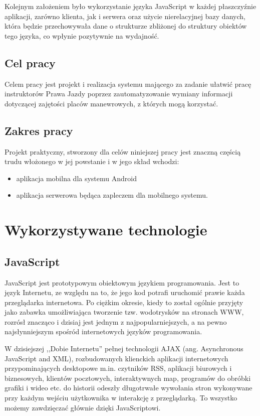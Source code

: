 \documentclass[twoside,a4paper,openright,12pt]{book}
\begin{document}
Kolejnym założeniem było wykorzystanie języka JavaScript w każdej płaszczyźnie aplikacji, zarówno klienta, jak i serwera oraz użycie nierelacyjnej bazy danych, która będzie przechowywała dane o strukturze zbliżonej do struktury obiektów tego języka, co wpłynie pozytywnie na wydajność.


\section{Cel pracy}

Celem pracy jest projekt i realizacja systemu mającego za zadanie ułatwić pracę instruktorów Prawa Jazdy poprzez zautomatyzowanie wymiany informacji dotyczącej zajętości placów manewrowych, z których mogą korzystać.


\section{Zakres pracy}

Projekt praktyczny, stworzony dla celów niniejszej pracy jest znaczną częścią trudu włożonego w jej powstanie i w jego skład wchodzi:

\begin{itemize}
	\item aplikacja mobilna dla systemu Android
	\item aplikacja serwerowa będąca zapleczem dla mobilnego systemu.
\end{itemize}




\chapter{Wykorzystywane technologie}

\section{JavaScript}

JavaScript jest prototypowym obiektowym językiem programowania. Jest to język Internetu, ze względu na to, że jego kod potrafi uruchomić prawie każda przeglądarka internetowa. Po ciężkim okresie, kiedy to został ogólnie przyjęty jako zabawka umożliwiająca tworzenie tzw. wodotrysków na stronach WWW, rozrósł znacząco i dzisiaj jest jednym z najpopularniejszych, a na pewno najsłynniejszym spośród internetowych języków programowania.

W dzisiejszej ,,Dobie Internetu'' pełnej technologii AJAX (ang. Asynchronous JavaScript and XML), rozbudowanych klienckich aplikacji internetowych przypominających desktopowe m.in. czytników RSS, aplikacji biurowych i biznesowych, klientów pocztowych, interaktywnych map, programów do obróbki grafiki i wideo etc. do historii odeszły długotrwałe wywołania stron wykonywane przy każdym wejściu użytkownika  w interakcję z przeglądarką. \cite{stefanov2012javascript}\cite{stefanov2010javascript}\cite{maccaw2012javascript} To wszystko możemy zawdzięczać głównie dzięki JavaScriptowi.
\end{document}
